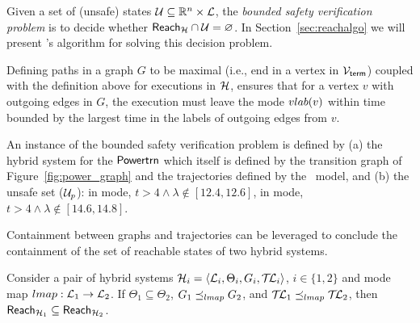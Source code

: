 %
Given
a set of (unsafe) states $\U \subseteq \reals^n \times \L$, the {\em
  bounded safety verification problem\/} is to decide whether
$\reach{\H} \cap \U = \emptyset$.  In Section~\ref{sec:reachalgo} we
will present \toolname's algorithm for solving this decision problem.

\begin{remark}
Defining paths in a graph $G$ to be maximal (i.e., end in a vertex in
${\mathcal V}_{{\sf term}}$) coupled with the definition above for executions in
${\mathcal H}$, ensures that for a vertex $v$ with outgoing edges in $G$, the
execution must leave the mode ${\sc vlab}(v)$ within time bounded by the
largest time in the labels of outgoing edges from $v$.
\end{remark}

An instance of the bounded safety verification problem is defined by
(a) the hybrid system for the ${\operatorname{\mathsf{Powertrn}}}$ which itself is
defined by the transition graph of Figure~\ref{fig:power_graph} and
the trajectories defined by the \Simulink\ model, and (b) the unsafe
set (${\mathcal U}_p$): in  mode, $t>4\wedge \lambda \notin
[12.4,12.6]$, in  mode, $t>4 \wedge \lambda \notin
[14.6,14.8]$.
%

Containment between graphs and trajectories can be leveraged to
conclude the containment of the set of reachable states of two hybrid
systems.
%
\begin{proposition}
\label{prop:hybrid-contain}
Consider a pair of hybrid systems ${\mathcal H}_i = \langle {\mathcal L}_i, \Theta_i, G_i,
\mathcal{T\mkern-3mu L}_i \rangle$, $i \in \{1,2\}$ and mode map ${\sc lmap}: {\mathcal L}_1 \to
{\mathcal L}_2$. If $\Theta_1 \subseteq \Theta_2$, $G_1 \preceq_{{\sc lmap}} G_2$,
and $\mathcal{T\mkern-3mu L}_1 \preceq_{{\sc lmap}} \mathcal{T\mkern-3mu L}_2$, then $\reach{\H_1} \subseteq
\reach{\H_2}$.
\end{proposition}

 
 
